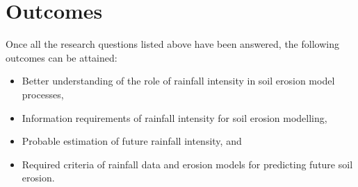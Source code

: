 \section{Outcomes}
\label{sec:ExpectedOutcomes}
Once all the research questions listed above have been answered, the following
outcomes can be attained:
\begin{itemize}
  \item Better understanding of the role of rainfall intensity in soil erosion
model processes,
  \item Information requirements of rainfall intensity for soil erosion
modelling,
  \item Probable estimation of future rainfall intensity, and
  \item Required criteria of rainfall data and erosion models for predicting
future soil erosion.
\end{itemize}


